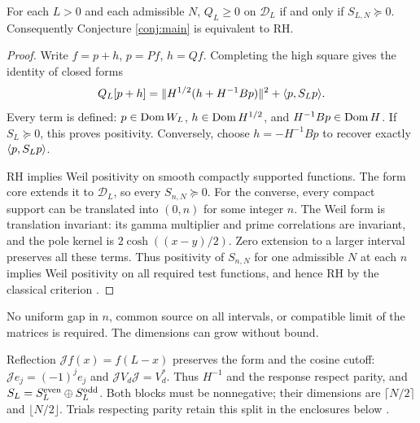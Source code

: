\begin{theorem}\label{thm:equiv}
For each $L>0$ and each admissible $N$, $Q_L\ge0$ on $\mathcal D_L$
if and only if $S_{L,N}\succeq0$.
Consequently Conjecture \ref{conj:main} is equivalent to RH.
\end{theorem}
\begin{proof}
Write $f=p+h$, $p=Pf$, $h=Qf$. Completing the high square gives the
identity of closed forms
\begin{equation}\label{eq:square}
Q_L[p+h]=\lVert H^{1/2}(h+H^{-1}Bp)\rVert^2+\langle p,S_Lp\rangle.
\end{equation}
Every term is defined: $p\in\operatorname{Dom} W_L$, $h\in\operatorname{Dom} H^{1/2}$, and
$H^{-1}Bp\in\operatorname{Dom} H$. If $S_L\succeq0$, this proves positivity. Conversely,
choose $h=-H^{-1}Bp$ to recover exactly $\langle p,S_Lp\rangle$.

RH implies Weil positivity on smooth compactly supported functions.
The form core extends it to $\mathcal D_L$, so every $S_{n,N}\succeq0$.
For the converse, every compact support can be translated into $(0,n)$
for some integer $n$. The Weil form is translation invariant: its gamma
multiplier and prime correlations are invariant, and the pole kernel is
$2\cosh((x-y)/2)$. Zero extension to a larger interval preserves all these
terms. Thus positivity of $S_{n,N}$ for one admissible $N$ at each $n$
implies Weil positivity on all required
test functions, and hence RH by the classical criterion \cite{Suzuki}.
\end{proof}
No uniform gap in $n$, common source on all intervals, or compatible limit
of the matrices is required. The dimensions can grow without bound.

Reflection $\mathcal Jf(x)=f(L-x)$ preserves the form and the cosine
cutoff: $\mathcal Je_j=(-1)^je_j$ and
$\mathcal JV_d\mathcal J=V_d^*$. Thus $H^{-1}$ and the response respect
parity, and $S_L=S_L^{\rm even}\oplus S_L^{\rm odd}$. Both blocks must be
nonnegative; their dimensions are $\lceil N/2\rceil$ and $\lfloor N/2\rfloor$.
Trials respecting parity retain this split in the enclosures below
\cite[Sections 6--7]{Companion}.

